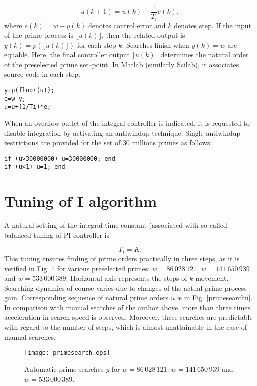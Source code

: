 \documentclass[12pt,a4paper,twoside]{article}
\begin{document}
$$
u(k+1)=u(k)+\frac{1}{T_i} e(k),
$$
where $ e (k) = w-y (k) $ denotes control error and $ k $ denotes step. If the input of the prime process is $ \lfloor u (k) \rfloor $, then the related output is $y (k) = p (\lfloor u (k) \rfloor) $ for each step $ k $. Searches finish when $ y (k) = w $ are equable. Here, the final controller output $\lfloor u (k)\rfloor$ determines the natural order of the preselected prime set--point. In Matlab (similarly Scilab), it associates source code in each step:

\begin{verbatim}
y=p(floor(u));
e=w-y;
u=u+(1/Ti)*e;
\end{verbatim}
When an overflow outlet of the integral controller is indicated, it is requested to disable integration by activating an antiwindup technique. Single antiwindup restrictions are provided for the set of $30$ millions primes as follows:

\begin{verbatim}
if (u>30000000) u=30000000; end
if (u<1) u=1; end
\end{verbatim}
   
\section{Tuning of I algorithm}   

\vspace{0.3cm}\noindent A natural setting of the integral time constant (associated with so called balanced tuning of PI controller \cite{kg2} is 

$$T_i=K.$$ 
This tuning ensures finding of prime orders practically in three steps, as it is verified in Fig. \ref{primesearch} for various preselected primes: $ w = 86 \, 028 \,  121$, $ w = 141 \ 650 \,  939$ and $ w = 533 \, 000 \,  389$. Horizontal axis represents the steps of $k$ movement. Searching dynamics of course varies due to changes of the actual prime process gain. Corresponding sequence of natural prime orders $ u $ is in Fig. \ref {primesearchu}. In comparison with manual searches of the author above, more than three times acceleration in search speed is observed. Moreover, these searches are predictable with regard to the number of steps, which is almost unattainable in the case of manual searches.

\begin{figure}[htbp]
\begin{center}
\texttt{[image: primesearch.eps]}
\end{center}
\caption{\small Automatic prime searches $y$ for $w=86\,028\,121$, $w=141\,650\,939$ and $w=533\,000\,389$.}
\label{primesearch}
\end{figure}
\end{document}
